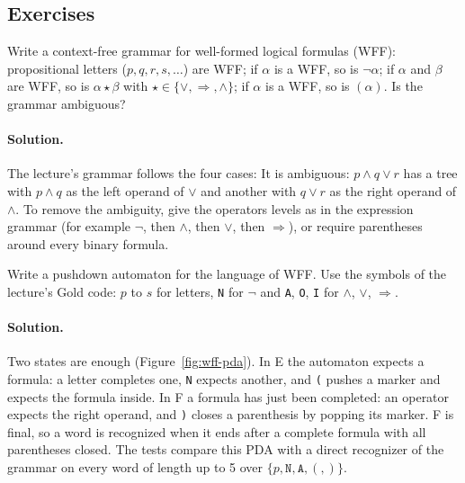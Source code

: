 \subsection{Exercises}

\begin{exercise}
Write a context-free grammar for well-formed logical formulas (WFF):
propositional letters ($p, q, r, s, \dots$) are WFF; if $\alpha$ is a WFF, so is
$\neg\alpha$; if $\alpha$ and $\beta$ are WFF, so is $\alpha \star \beta$ with $\star \in
\{\vee, \Rightarrow, \wedge\}$; if $\alpha$ is a WFF, so is $(\alpha)$. Is the grammar
ambiguous?
\end{exercise}

\paragraph{Solution.} The lecture's grammar follows the four cases:
It is ambiguous: $p \wedge q \vee r$ has a tree with $p \wedge q$ as the left
operand of $\vee$ and another with $q \vee r$ as the right operand of $\wedge$. To
remove the ambiguity, give the operators levels as in the expression grammar
(for example $\neg$, then $\wedge$, then $\vee$, then $\Rightarrow$), or require
parentheses around every binary formula.

\begin{exercise}
Write a pushdown automaton for the language of WFF. Use the symbols of the
lecture's Gold code: $p$ to $s$ for letters, \texttt{N} for $\neg$ and
\texttt{A}, \texttt{O}, \texttt{I} for $\wedge$, $\vee$, $\Rightarrow$.
\end{exercise}

\paragraph{Solution.} Two states are enough (Figure~\ref{fig:wff-pda}). In E the
automaton expects a formula: a letter completes one, \texttt{N} expects
another, and \texttt{(} pushes a marker and expects the formula inside. In F a
formula has just been completed: an operator expects the right operand, and
\texttt{)} closes a parenthesis by popping its marker. F is final, so a word is
recognized when it ends after a complete formula with all parentheses closed.
The tests compare this PDA with a direct recognizer of the grammar on every
word of length up to 5 over $\{p, \texttt{N}, \texttt{A}, (, )\}$.

